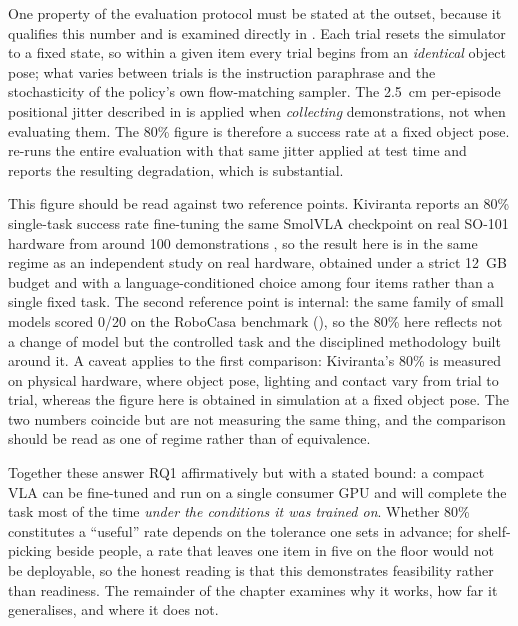 One property of the evaluation protocol must be stated at the outset, because it
qualifies this number and is examined directly in .
Each trial resets the simulator to a fixed state, so within a given item every trial
begins from an \emph{identical} object pose; what varies between trials is the
instruction paraphrase and the stochasticity of the policy's own flow-matching
sampler. The \SI{2.5}{cm} per-episode positional jitter described in
 is applied when \emph{collecting} demonstrations, not when
evaluating them. The 80\% figure is therefore a success rate at a fixed object pose.
 re-runs the entire evaluation with that same jitter
applied at test time and reports the resulting degradation, which is substantial.

This figure should be read against two reference points. Kiviranta reports an 80\%
single-task success rate fine-tuning the same SmolVLA checkpoint on real SO-101
hardware from around 100 demonstrations \parencite{kiviranta2025smolvla}, so the result
here is in the same regime as an independent study on real hardware, obtained under a
strict 12~GB budget and with a language-conditioned choice among four items rather
than a single fixed task. The second reference point is internal: the same family of
small models scored 0/20 on the RoboCasa benchmark (), so
the 80\% here reflects not a change of model but the controlled task and the
disciplined methodology built around it. A caveat applies to the first comparison:
Kiviranta's 80\% is measured on physical hardware, where object pose, lighting and
contact vary from trial to trial, whereas the figure here is obtained in simulation at
a fixed object pose. The two numbers coincide but are not measuring the same thing,
and the comparison should be read as one of regime rather than of equivalence.

Together these answer RQ1 affirmatively but with a stated bound: a compact VLA can be
fine-tuned and run on a single consumer GPU and will complete the task most of the
time \emph{under the conditions it was trained on}. Whether 80\% constitutes a
``useful'' rate depends on the tolerance one sets in advance; for shelf-picking beside
people, a rate that leaves one item in five on the floor would not be deployable, so
the honest reading is that this demonstrates feasibility rather than readiness. The
remainder of the chapter examines why it works, how far it generalises, and where it
does not.

